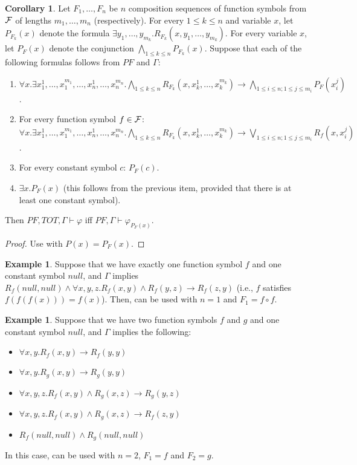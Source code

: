 \documentclass[11pt,a4paper,oneside]{article}
\theoremstyle{definition}
\newtheorem{example}[definition]{Example}
\newtheorem{corollary}[definition]{Corollary}
\theoremstyle{remark}
\newcommand{\vd}{\vdash}
\newcommand{\til}{,\dots,}
\newcommand{\fe}{\varphi}
\begin{document}
\begin{corollary}
\label{function_elimination_corollary}
Let $F_1 \til F_n$
be $n$ composition sequences of function symbols from ${\cal F}$ of lengths $m_1 \til m_n$ (respectively).
For every $1\leq k\leq n$ and variable $x$,
let $P_{F_k}(x)$ denote the formula $\exists y_1 \til y_{m_k}. R_{F_k}(x,y_1 \til y_{m_k})$.
For every  variable $x$,
let $P_{F}(x)$ denote the conjunction  $\bigwedge_{1\leq k\leq n} P_{F_k}(x)$.
Suppose that each of the following formulas follows from $PF$ and $\Gamma$:
\begin{enumerate}
\item $\forall x. \exists  x^1_1 \til x^{m_1}_1 \til x^1_n \til x^{m_n}_n. \bigwedge_{1\leq k\leq n} R_{F_k}(x,x^1_k  \til x^{m_k}_k) \to \bigwedge_{1 \leq i \leq n; 1\leq j \leq m_i} P_{F}(x^j_i)$.
\item 
For every function symbol $f\in {\cal F}$: \\
$\forall x. \exists  x^1_1 \til x^{m_1}_1 \til x^1_n \til x^{m_n}_n. \bigwedge_{1\leq k\leq n} R_{F_k}(x,x^1_k  \til x^{m_k}_k) \to \bigvee_{1 \leq i \leq n; 1\leq j \leq m_i} R_f(x,x^j_i)$.
\item 
For every constant symbol $c$:
$P_{F}(c)$.
\item $\exists x. P_{F}(x)$ (this follows from the previous item, provided that there is at least one constant symbol).
\end{enumerate}
Then $PF, TOT, \Gamma \vd \fe$ iff $PF, \Gamma \vd \fe_{P_{F}(x)}$.
\end{corollary}

\begin{proof}
Use  with $P(x)=P_{F}(x)$.
\end{proof}

\begin{example}
Suppose that we have exactly one function symbol $f$ and one constant symbol $null$,
and $\Gamma$ implies $R_f(null,null) \land  \forall x, y,z. R_f(x,y) \land R_f(y,z) \to R_f (z,y)$ (i.e., $f$ satisfies $f(f(f(x)))=f(x)$).
Then,  can be used with
$n=1$ and $F_1=f \circ f$.
\end{example}

\begin{example}
\label{cycles}
Suppose that we have two function symbols $f$ and $g$ and one constant symbol $null$, and $\Gamma$ implies the following:
\begin{itemize}
\item $\forall x, y. R_f(x,y) \to R_f (y,y)$
\item $\forall x, y. R_g(x,y) \to R_g (y,y)$
\item $\forall x, y,z. R_f(x,y) \land R_g (x,z) \to R_g (y,z) $
\item $\forall x, y,z. R_f(x,y) \land R_g (x,z) \to R_f (z,y) $
\item $R_f(null,null) \land R_g(null,null)$
\end{itemize}
In this case,  can be used with
$n=2$, $F_1=f$ and $F_2=g$.
\end{example}
\end{document}
